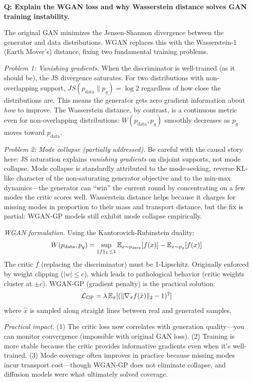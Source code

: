 \begin{interviewq}
\textbf{Q: Explain the WGAN loss and why Wasserstein distance solves GAN training instability.}

 \quad {} \quad \badgefreq{\freqmed}

\stronganswer The original GAN minimizes the Jensen-Shannon divergence between the generator and data distributions. WGAN replaces this with the Wasserstein-1 (Earth Mover's) distance, fixing two fundamental training problems.

\textit{Problem 1: Vanishing gradients.} When the discriminator is well-trained (as it should be), the JS divergence saturates. For two distributions with non-overlapping support, $JS(p_{\text{data}} \| p_g) = \log 2$ regardless of how close the distributions are. This means the generator gets zero gradient information about \textit{how} to improve. The Wasserstein distance, by contrast, is a continuous metric even for non-overlapping distributions: $W(p_{\text{data}}, p_g)$ smoothly decreases as $p_g$ moves toward $p_{\text{data}}$.

\textit{Problem 2: Mode collapse (partially addressed).} Be careful with the causal story here: JS saturation explains \textit{vanishing gradients} on disjoint supports, not mode collapse. Mode collapse is standardly attributed to the mode-seeking, reverse-KL-like character of the non-saturating generator objective and to the min-max dynamics---the generator can ``win'' the current round by concentrating on a few modes the critic scores well. Wasserstein distance helps because it charges for missing modes in proportion to their mass and transport distance, but the fix is partial: WGAN-GP models still exhibit mode collapse empirically.

\textit{WGAN formulation.} Using the Kantorovich-Rubinstein duality:
$$W(p_{\text{data}}, p_g) = \sup_{\|f\|_L \leq 1} \operatorname{\mathbb{E}}_{x \sim p_{\text{data}}}[f(x)] - \operatorname{\mathbb{E}}_{x \sim p_g}[f(x)]$$
The critic $f$ (replacing the discriminator) must be 1-Lipschitz. Originally enforced by weight clipping ($|w| \leq c$), which leads to pathological behavior (critic weights cluster at $\pm c$). WGAN-GP (gradient penalty) is the practical solution:
$$\mathcal{L}_{\text{GP}} = \lambda \operatorname{\mathbb{E}}_{\hat{x}}[(\|\nabla_{\hat{x}} f(\hat{x})\|_2 - 1)^2]$$
where $\hat{x}$ is sampled along straight lines between real and generated samples.

\textit{Practical impact.} (1) The critic loss now correlates with generation quality---you can monitor convergence (impossible with original GAN loss). (2) Training is more stable because the critic provides informative gradients even when it's well-trained. (3) Mode coverage often improves in practice because missing modes incur transport cost---though WGAN-GP does not eliminate collapse, and diffusion models were what ultimately solved coverage.


\end{interviewq}
